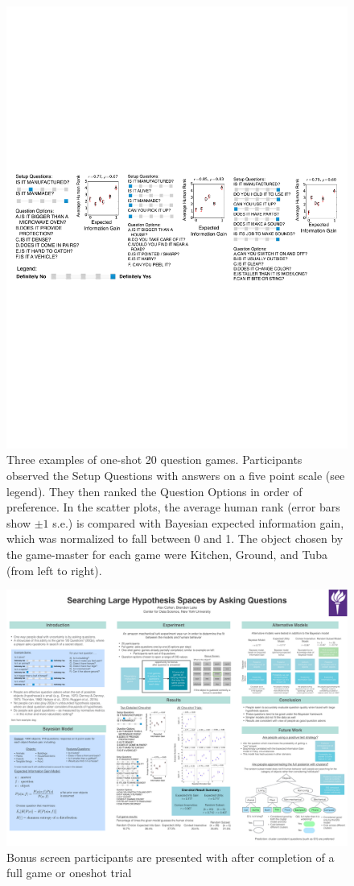 \documentclass[11pt,letterpaper]{article}
\begin{document}
\begin{figure}[h!]
\begin{center}
\includegraphics[width=1.0\linewidth]{example_trials}
\end{center}
\caption{Three examples of one-shot 20 question games. Participants observed the Setup Questions with answers on a five point scale (see legend). They then ranked the Question Options in order of preference. In the scatter plots, the average human rank (error bars show $\pm 1$ s.e.) is compared with Bayesian expected information gain, which was normalized to fall between 0 and 1. The object chosen by the game-master for each game were Kitchen, Ground, and Tuba (from left to right).} 
\label{trials-with-questions}
\end{figure}


\begin{figure}[h!]
\begin{center}
\includegraphics[width=0.4\linewidth]{bonus_screen}
\end{center}
\caption{Bonus screen participants are presented with after completion of a full game or oneshot trial} 
\label{bonus_screen}
\end{figure}
\end{document}
